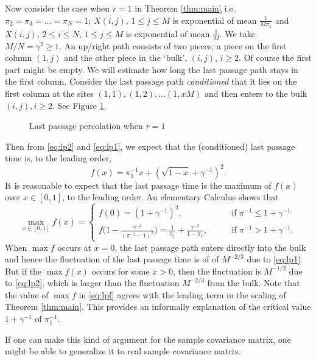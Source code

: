 \documentclass[11pt]{article}
\begin{document}
Now consider the case when $r=1$ in Theorem \ref{thm:main} i.e.
$\pi_2=\pi_3=\dots = \pi_N=1$; $X(i,j)$, $1\le j\le M$ is
exponential of mean $\frac1{M\pi_1}$ and $X(i,j)$, $2\le i\le N$,
$1\le j\le M$ is exponential of mean $\frac1{M}$. We take
$M/N=\gamma^2\ge 1$. An up/right path consists of two pieces; a
piece on the first column $(1,j)$ and the other piece in the
`bulk', $(i,j)$, $i\ge 2$. Of course the first part might be
empty. We will estimate how long the last passage path stays in
the first column. Consider the last passage path
\emph{conditioned} that it lies on the first column at the sites
$(1,1), (1,2),\dots (1,xM)$ and then enters to the bulk $(i,j),
i\ge 2$. See Figure \ref{fig:last}.
\begin{figure}[ht]
\centerline{\epsfxsize=8cm} \caption{Last
passage percolation when $r=1$} \label{fig:last}
\end{figure}
Then from \eqref{eq:lp2} and \eqref{eq:lp1}, we expect that the
(conditioned) last passage time is, to the leading order,
\begin{equation}
  f(x) = \pi_1^{-1}x + (\sqrt{1-x} +\gamma^{-1})^2.
\end{equation}
It is reasonable to expect that the last passage time is the maximum of $f(x)$
over $x\in [0,1]$, to the leading order. An elementary Calculus
shows that
\begin{equation}\label{eq:lpf}
  \max_{x\in [0,1]} f(x) = \begin{cases}
  f(0) = (1+\gamma^{-1})^2, \qquad &\text{if $\pi^{-1}\le
  1+\gamma^{-1}$} \\
  f\bigl( 1- \frac{\gamma^{-2}}{(\pi^{-1}-1)^2} \bigr)
  = \frac1{\pi_1}+\frac{\gamma^{-2}}{1-\pi_1},
  \qquad &  \text{if $\pi^{-1} >  1+\gamma^{-1}$.}
  \end{cases}
\end{equation}
When $\max f$ occurs at $x=0$, the last passage path enters
directly into the bulk and hence the fluctuation of the last
passage time is of of $M^{-2/3}$ due to \eqref{eq:lp1}. But if the
$\max f(x)$ occurs for some $x>0$, then the fluctuation is
$M^{-1/2}$ due to \eqref{eq:lp2}, which is larger than the
fluctuation $M^{-2/3}$ from the bulk. Note that the value of $\max
f$ in \eqref{eq:lpf} agrees with the leading term in the scaling
of Theorem \ref{thm:main}. This provides an informally explanation
of the critical value $1+\gamma^{-1}$ of $\pi_1^{-1}$.

If one can make this kind of argument for the sample covariance
matrix, one might be able to generalize it to real sample
covariance matrix.
\end{document}
